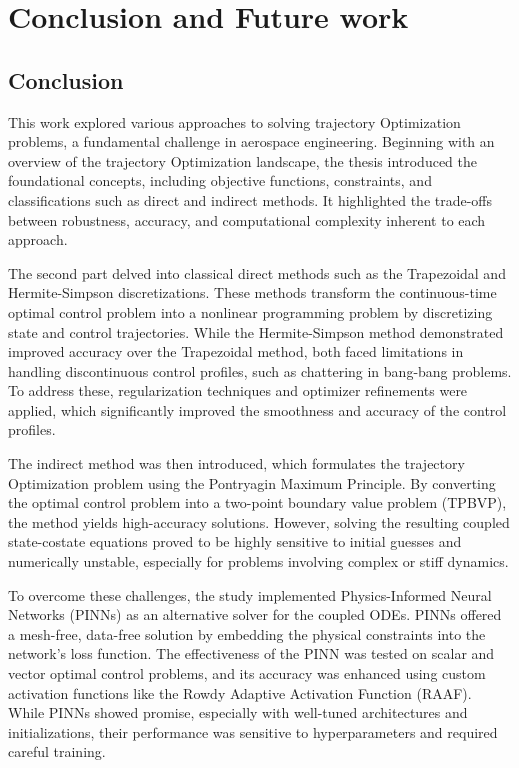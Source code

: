 \chapter*{Conclusion and Future work}

\ifpdf
    \graphicspath{{Chapter4/Figs/Raster/}{Chapter4/Figs/PDF/}{Chapter4/Figs/}}
\else
    \graphicspath{{Chapter4/Figs/Vector/}{Chapter4/Figs/}}
\fi



\section*{Conclusion}

This work explored various approaches to solving trajectory Optimization problems, a fundamental challenge in aerospace engineering. Beginning with an overview of the trajectory Optimization landscape, the thesis introduced the foundational concepts, including objective functions, constraints, and classifications such as direct and indirect methods. It highlighted the trade-offs between robustness, accuracy, and computational complexity inherent to each approach.

The second part delved into classical direct methods such as the Trapezoidal and Hermite-Simpson discretizations. These methods transform the continuous-time optimal control problem into a nonlinear programming problem by discretizing state and control trajectories. While the Hermite-Simpson method demonstrated improved accuracy over the Trapezoidal method, both faced limitations in handling discontinuous control profiles, such as chattering in bang-bang problems. To address these, regularization techniques and optimizer refinements were applied, which significantly improved the smoothness and accuracy of the control profiles.

The indirect method was then introduced, which formulates the trajectory Optimization problem using the Pontryagin Maximum Principle. By converting the optimal control problem into a two-point boundary value problem (TPBVP), the method yields high-accuracy solutions. However, solving the resulting coupled state-costate equations proved to be highly sensitive to initial guesses and numerically unstable, especially for problems involving complex or stiff dynamics.

To overcome these challenges, the study implemented Physics-Informed Neural Networks (PINNs) as an alternative solver for the coupled ODEs. PINNs offered a mesh-free, data-free solution by embedding the physical constraints into the network’s loss function. The effectiveness of the PINN was tested on scalar and vector optimal control problems, and its accuracy was enhanced using custom activation functions like the Rowdy Adaptive Activation Function (RAAF). While PINNs showed promise, especially with well-tuned architectures and initializations, their performance was sensitive to hyperparameters and required careful training.

